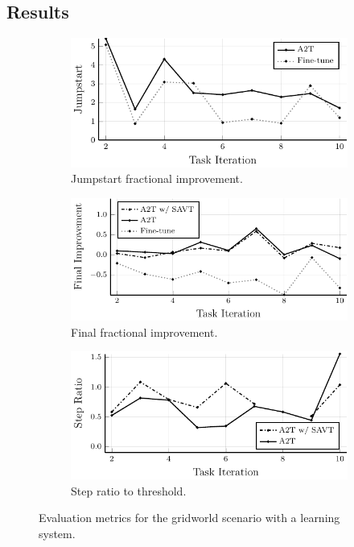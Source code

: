 \subsection{Results}
\begin{figure}
    \centering
    \begin{subfigure}[b]{0.32\textwidth}
        \centering
        \includegraphics[width=\textwidth]{figures/iterative_validation/gridworld_learning/jumpstart.pdf}
        \caption{Jumpstart fractional improvement.}
        \label{fig:gwl_jumpstart}
    \end{subfigure}
    \hfill
    \begin{subfigure}[b]{0.32\textwidth}
        \centering
        \includegraphics[width=\textwidth]{figures/iterative_validation/gridworld_learning/peak_performance.pdf}
        \caption{Final fractional improvement.}
        \label{fig:gwl_final}
    \end{subfigure}
    \hfill
    \begin{subfigure}[b]{0.32\textwidth}
        \centering
        \includegraphics[width=\textwidth]{figures/iterative_validation/gridworld_learning/steps_to_threshold.pdf}
        \caption{Step ratio to threshold.}
        \label{fig:gwl_step}
    \end{subfigure}
    \caption{Evaluation metrics for the gridworld scenario with a learning system.}
    \label{fig:gwl}
\end{figure}



